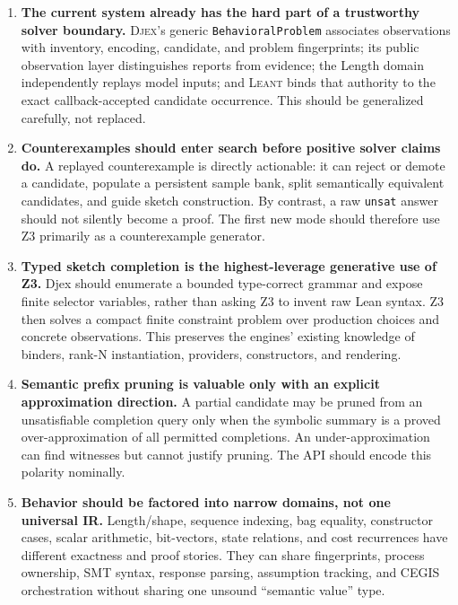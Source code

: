 \documentclass[11pt,oneside]{report}
\newcommand{\Leant}{\textsc{Leant}\xspace}
\newcommand{\Djex}{\textsc{Djex}\xspace}
\newcommand{\code}[1]{\texttt{#1}}
\begin{document}
\begin{enumerate}[leftmargin=2.15em,label=\textbf{\arabic*.}]
\item \textbf{The current system already has the hard part of a trustworthy solver boundary.} \Djex's generic \code{BehavioralProblem} associates observations with inventory, encoding, candidate, and problem fingerprints; its public observation layer distinguishes reports from evidence; the Length domain independently replays model inputs; and \Leant binds that authority to the exact callback-accepted candidate occurrence. This should be generalized carefully, not replaced.

\item \textbf{Counterexamples should enter search before positive solver claims do.} A replayed counterexample is directly actionable: it can reject or demote a candidate, populate a persistent sample bank, split semantically equivalent candidates, and guide sketch construction. By contrast, a raw \texttt{unsat} answer should not silently become a proof. The first new mode should therefore use Z3 primarily as a counterexample generator.

\item \textbf{Typed sketch completion is the highest-leverage generative use of Z3.} Djex should enumerate a bounded type-correct grammar and expose finite selector variables, rather than asking Z3 to invent raw Lean syntax. Z3 then solves a compact finite constraint problem over production choices and concrete observations. This preserves the engines' existing knowledge of binders, rank-N instantiation, providers, constructors, and rendering.

\item \textbf{Semantic prefix pruning is valuable only with an explicit approximation direction.} A partial candidate may be pruned from an unsatisfiable completion query only when the symbolic summary is a proved over-approximation of all permitted completions. An under-approximation can find witnesses but cannot justify pruning. The API should encode this polarity nominally.

\item \textbf{Behavior should be factored into narrow domains, not one universal IR.} Length/shape, sequence indexing, bag equality, constructor cases, scalar arithmetic, bit-vectors, state relations, and cost recurrences have different exactness and proof stories. They can share fingerprints, process ownership, SMT syntax, response parsing, assumption tracking, and CEGIS orchestration without sharing one unsound ``semantic value'' type.


\end{enumerate}
\end{document}

